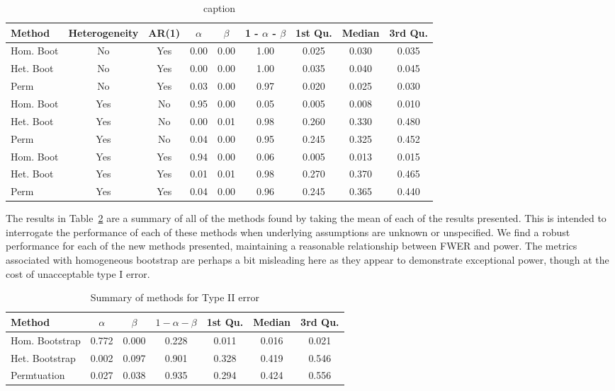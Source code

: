 \documentclass{article}
\begin{document}
\begin{table}[H]
\centering
\begin{tabular}{lcccccccc}
  \hline
Method & Heterogeneity & AR(1) & $\alpha$ & $\beta$ & 1 - $\alpha$ - $\beta$ & 1st Qu. & Median & 3rd Qu. \\ 
  \hline
Hom. Boot & No & Yes & 0.00 & 0.00 & 1.00 & 0.025 & 0.030 & 0.035 \\ 
  Het. Boot & No & Yes & 0.00 & 0.00 & 1.00 & 0.035 & 0.040 & 0.045 \\ 
  Perm & No & Yes & 0.03 & 0.00 & 0.97 & 0.020 & 0.025 & 0.030 \\
  \hline
  Hom. Boot & Yes & No & 0.95 & 0.00 & 0.05 & 0.005 & 0.008 & 0.010 \\ 
  Het. Boot & Yes & No & 0.00 & 0.01 & 0.98 & 0.260 & 0.330 & 0.480 \\ 
  Perm & Yes & No & 0.04 & 0.00 & 0.95 & 0.245 & 0.325 & 0.452 \\
  \hline
  Hom. Boot & Yes & Yes & 0.94 & 0.00 & 0.06 & 0.005 & 0.013 & 0.015 \\ 
  Het. Boot & Yes & Yes & 0.01 & 0.01 & 0.98 & 0.270 & 0.370 & 0.465 \\ 
  Perm & Yes & Yes & 0.04 & 0.00 & 0.96 & 0.245 & 0.365 & 0.440 \\ 
   \hline
\end{tabular}
\caption{caption} 
\label{tab:power_methods}
\end{table}

The results in Table~\ref{tab:type_2_summary} are a summary of all of the methods found by taking the mean of each of the results presented. This is intended to interrogate the performance of each of these methods when underlying assumptions are unknown or unspecified. We find a robust performance for each of the new methods presented, maintaining a reasonable relationship between FWER and power. The metrics associated with homogeneous bootstrap are perhaps a bit misleading here as they appear to demonstrate exceptional power, though at the cost of unacceptable type I error.

\begin{table}[H]
\centering
\begin{tabular}{lcccccc}
  \hline
Method & $\alpha$ & $\beta$ & $1 - \alpha - \beta$ & 1st Qu. & Median & 3rd Qu. \\ 
  \hline
Hom. Bootstrap & 0.772 & 0.000 & 0.228 & 0.011 & 0.016 & 0.021 \\ 
  Het. Bootstrap & 0.002 & 0.097 & 0.901 & 0.328 & 0.419 & 0.546 \\ 
  Permtuation & 0.027 & 0.038 & 0.935 & 0.294 & 0.424 & 0.556 \\ 
   \hline
\end{tabular}
\caption{Summary of methods for Type II error} 
\label{tab:type_2_summary}
\end{table}
\end{document}
